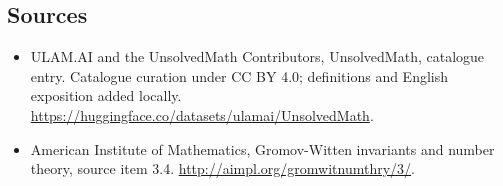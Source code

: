 \documentclass[11pt]{article}
\begin{document}
\subsection{Sources}
\begin{itemize}
\item[\hypertarget{source:statement:1}{S1}] ULAM.AI and the UnsolvedMath Contributors, UnsolvedMath, catalogue entry. Catalogue curation under CC BY 4.0; definitions and English exposition added locally.
\url{https://huggingface.co/datasets/ulamai/UnsolvedMath}.
\item[\hypertarget{source:statement:2}{S2}] American Institute of Mathematics, Gromov-Witten invariants and number theory, source item 3.4.
\url{http://aimpl.org/gromwitnumthry/3/}.
\end{itemize}
\label{end:statement}
\end{document}
